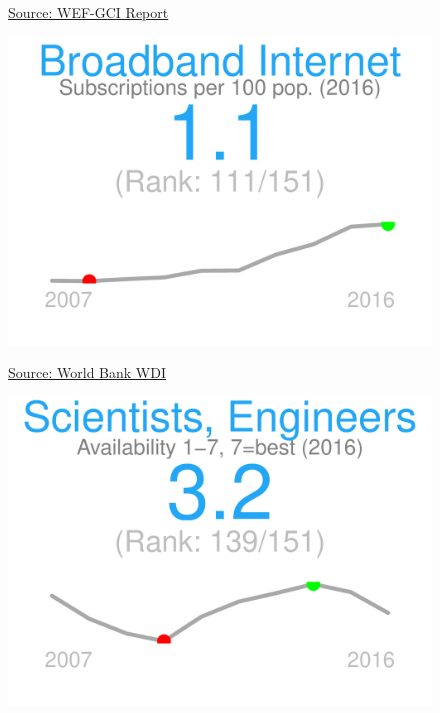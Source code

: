 \documentclass{article}\usepackage[]{graphicx}\usepackage[]{color}
\makeatletter
\def\maxwidth{ %
  \ifdim\Gin@nat@width>\linewidth
    \linewidth
  \else
    \Gin@nat@width
  \fi
}
\makeatother
\begin{document}
\begin{figure}
\begin{minipage}[t]{0.99\textwidth}
\begin{minipage}[t]{0.56\textwidth}
\begin{minipage}[c]{0.30\textwidth}
    \vspace{-2ex}
    \hspace{2ex}\tiny{\href{http://www3.weforum.org/docs/gcr/2015-2016/GCI_Dataset_2006-2015.xlsx}{\textcolor[HTML]{22A6F5}{Source: WEF-GCI Report}}}
    \vspace{3ex}
    \end{minipage}
    \begin{minipage}[c]{0.30\textwidth}


{\centering \includegraphics[width=\maxwidth]{figure/figure_sparkline3-1} 

}



    \vspace{-2ex}
    \hspace{2ex}\tiny{\href{http://data.worldbank.org}{\textcolor[HTML]{22A6F5}{Source: World Bank WDI}}}
    \vspace{3ex}
    \end{minipage}
    
    \begin{minipage}[c]{0.30\textwidth}


{\centering \includegraphics[width=\maxwidth]{figure/figure_sparkline4-1} 

}
\end{minipage}
\end{minipage}
\end{minipage}
\end{figure}
\end{document}
